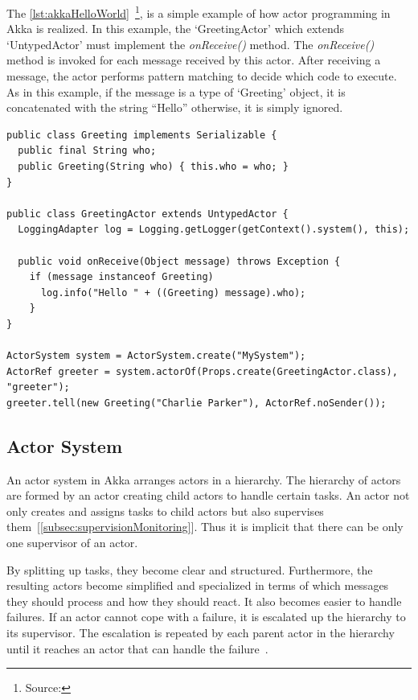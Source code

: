   The \autoref{lst:akkaHelloWorld}~\footnote{Source: }, is a simple example of how actor programming in Akka is realized. In this example, the ‘GreetingActor’ which extends ‘UntypedActor’ must implement the \emph{onReceive()} method. The \emph{onReceive()} method is invoked for each message received by this actor. After receiving a message, the actor performs pattern matching to decide which code to execute. As in this example, if the message is a type of ‘Greeting’ object, it is concatenated with the string “Hello” otherwise, it is simply ignored.

\begin{lstlisting}[caption=A simple example of actor programming in Akka~\cite{akkaHome}, label=lst:akkaHelloWorld]
public class Greeting implements Serializable {
  public final String who;
  public Greeting(String who) { this.who = who; }
}

public class GreetingActor extends UntypedActor {
  LoggingAdapter log = Logging.getLogger(getContext().system(), this);

  public void onReceive(Object message) throws Exception {
    if (message instanceof Greeting)
      log.info("Hello " + ((Greeting) message).who);
    }
}

ActorSystem system = ActorSystem.create("MySystem");
ActorRef greeter = system.actorOf(Props.create(GreetingActor.class), "greeter");
greeter.tell(new Greeting("Charlie Parker"), ActorRef.noSender());
\end{lstlisting}


  \subsection{Actor System}
  \label{subsec:actorSystem}
    An actor system in Akka arranges actors in a hierarchy. The hierarchy of actors are formed by an actor creating child actors to handle certain tasks. An actor not only creates and assigns tasks to child actors but also supervises them~[\autoref{subsec:supervisionMonitoring}]. Thus it is implicit that there can be only one supervisor of an actor.

  By splitting up tasks, they become clear and structured. Furthermore, the resulting actors become simplified and specialized in terms of which messages they should process and how they should react. It also becomes easier to handle failures. If an actor cannot cope with a failure, it is escalated up the hierarchy to its supervisor. The escalation is repeated by each parent actor in the hierarchy until it reaches an actor that can handle the failure~\cite{akkaJavaDoc}.

